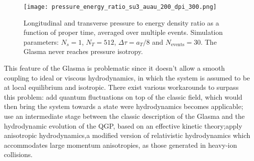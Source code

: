 \begin{figure}[!hbt]
	\texttt{[image: pressure\_energy\_ratio\_su3\_auau\_200\_dpi\_300.png]}
	\caption{\normalsize Longitudinal and transverse pressure to energy density ratio as a function of proper time, averaged over multiple events. Simulation parameters: $N_s=1$, $N_T=512$, $\Delta\tau=a_T/8$ and $N_\text{events}=30$. The Glasma never reaches pressure isotropy.} 
\end{figure}

This feature of the Glasma is problematic since it doesn't allow a smooth coupling to ideal or viscous hydrodynamics, in which the system is assumed to be at local equilibrium and isotropic. There exist various workarounds to surpass this problem: add quantum fluctuations on top of the classic field, which would then bring the system towards a state were hydrodynamics becomes applicable; use an intermediate stage between the classic description of the Glasma and the hydrodynamic evolution of the QGP, based on an effective kinetic theory;apply anisotropic hydrodynamics,a modified version of relativistic hydrodynamics which accommodates large momentum anisotropies, as those generated in heavy-ion collisions.
 


